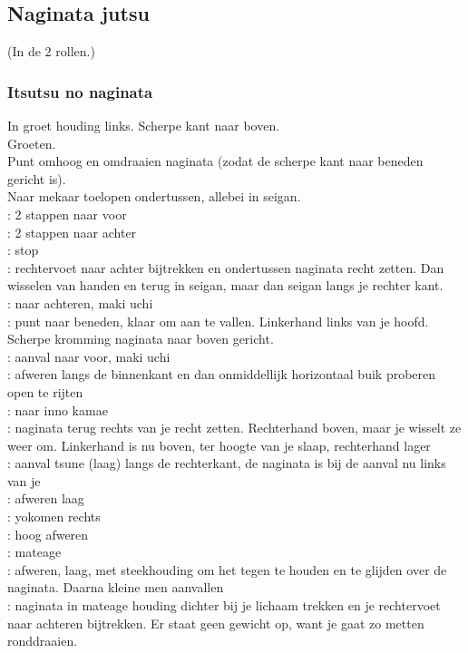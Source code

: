 \subsection{Naginata jutsu}
(In de 2 rollen.)

\subsubsection{Itsutsu no naginata}

In groet houding links. Scherpe kant naar boven.\\
Groeten.\\
Punt omhoog en omdraaien naginata (zodat de scherpe kant naar beneden gericht is).\\
Naar mekaar toelopen ondertussen, allebei in seigan.\\
\pA: 2 stappen naar voor\\
\pB: 2 stappen naar achter\\
\pA: stop\\
\pB: rechtervoet naar achter bijtrekken en ondertussen naginata recht zetten. Dan wisselen van handen en terug in seigan, maar dan seigan langs je rechter kant.\\
\pA: naar achteren, maki uchi\\
\pB: punt naar beneden, klaar om aan te vallen. Linkerhand links van je hoofd. Scherpe kromming naginata naar boven gericht.\\
\pA: aanval naar voor, maki uchi\\
\pB: afweren langs de binnenkant en dan onmiddellijk horizontaal buik proberen open te rijten\\
\pA: naar inno kamae\\
\pB: naginata terug rechts van je recht zetten. Rechterhand boven, maar je wisselt ze weer om. Linkerhand is nu boven, ter hoogte van je slaap, rechterhand lager\\
\pB: aanval tsune (laag) langs de rechterkant, de naginata is bij de aanval nu links van je\\
\pA: afweren laag\\
\pB: yokomen rechts\\
\pA: hoog afweren\\
\pB: mateage\\
\pA: afweren, laag, met steekhouding om het tegen te houden en te glijden over de naginata. Daarna kleine men aanvallen\\
\pB: naginata in mateage houding dichter bij je lichaam trekken en je rechtervoet naar achteren bijtrekken. Er staat geen gewicht op, want je gaat zo metten ronddraaien.\\
